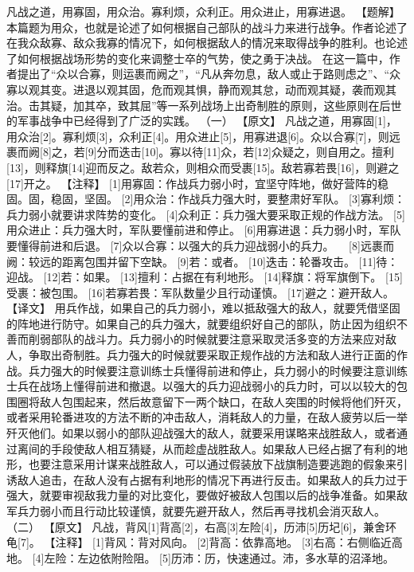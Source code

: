 \documentclass[a4paper,12pt,UTF8,twoside]{ctexbook}
\begin{document}
凡战之道，用寡固，用众治。寡利烦，众利正。用众进止，用寡进退。
【题解】
本篇题为用众，也就是论述了如何根据自己部队的战斗力来进行战争。作者论述了在我众敌寡、敌众我寡的情况下，如何根据敌人的情况来取得战争的胜利。也论述了如何根据战场形势的变化来调整士卒的气势，使之勇于决战。
在这一篇中，作者提出了“众以合寡，则运裹而阙之”，“凡从奔勿息，敌人或止于路则虑之”、“众寡以观其变。进退以观其固，危而观其惧，静而观其怠，动而观其疑，袭而观其治。击其疑，加其卒，致其屈”等一系列战场上出奇制胜的原则，这些原则在后世的军事战争中已经得到了广泛的实践。
（一）
【原文】
凡战之道，用寡固[1]，用众治[2]。寡利烦[3]，众利正[4]。用众进止[5]，用寡进退[6]。众以合寡[7]，则远裹而阙[8]之，若[9]分而迭击[10]。寡以待[11]众，若[12]众疑之，则自用之。擅利[13]，则释旗[14]迎而反之。敌若众，则相众而受裹[15]。敌若寡若畏[16]，则避之[17]开之。
【注释】
[1]用寡固：作战兵力弱小时，宜坚守阵地，做好营阵的稳固。固，稳固，坚固。
[2]用众治：作战兵力强大时，要整肃好军队。
[3]寡利烦：兵力弱小就要讲求阵势的变化。
[4]众利正：兵力强大要采取正规的作战方法。
[5]用众进止：兵力强大时，军队要懂前进和停止。
[6]用寡进退：兵力弱小时，军队要懂得前进和后退。
[7]众以合寡：以强大的兵力迎战弱小的兵力。
　[8]远裹而阙：较远的距离包围并留下空缺。
[9]若：或者。
[10]迭击：轮番攻击。
[11]待：迎战。
[12]若：如果。
[13]擅利：占据在有利地形。
[14]释旗：将军旗倒下。
[15]受裹：被包围。
[16]若寡若畏：军队数量少且行动谨慎。
[17]避之：避开敌人。
【译文】
用兵作战，如果自己的兵力弱小，难以抵敌强大的敌人，就要凭借坚固的阵地进行防守。如果自己的兵力强大，就要组织好自己的部队，防止因为组织不善而削弱部队的战斗力。兵力弱小的时候就要注意采取灵活多变的方法来应对敌人，争取出奇制胜。兵力强大的时候就要采取正规作战的方法和敌人进行正面的作战。兵力强大的时候要注意训练士兵懂得前进和停止，兵力弱小的时候要注意训练士兵在战场上懂得前进和撤退。以强大的兵力迎战弱小的兵力时，可以以较大的包围圈将敌人包围起来，然后故意留下一两个缺口，在敌人突围的时候将他们歼灭，或者采用轮番进攻的方法不断的冲击敌人，消耗敌人的力量，在敌人疲劳以后一举歼灭他们。如果以弱小的部队迎战强大的敌人，就要采用谋略来战胜敌人，或者通过离间的手段使敌人相互猜疑，从而趁虚战胜敌人。如果敌人已经占据了有利的地形，也要注意采用计谋来战胜敌人，可以通过假装放下战旗制造要逃跑的假象来引诱敌人追击，在敌人没有占据有利地形的情况下再进行反击。如果敌人的兵力过于强大，就要审视敌我力量的对比变化，要做好被敌人包围以后的战争准备。如果敌军兵力弱小而且行动比较谨慎，就要先避开敌人，然后再寻找机会消灭敌人。
（二）
【原文】
凡战，背风[1]背高[2]，右高[3]左险[4]，历沛[5]历圮[6]，兼舍环龟[7]。
【注释】
[1]背风：背对风向。
[2]背高：依靠高地。
[3]右高：右侧临近高地。
[4]左险：左边依附险阻。
[5]历沛：历，快速通过。沛，多水草的沼泽地。
\end{document}
